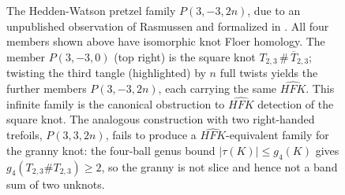 \begin{figure}[ht]
\centering
{}
\caption[The Hedden-Watson pretzel family $P(3,-3,2n)$]{%
The Hedden-Watson pretzel family $P(3,-3,2n)$, due to an unpublished observation of Rasmussen and formalized in \cite{HeddenWatson2018}. All four members shown above have isomorphic knot Floer homology. The member $P(3,-3,0)$ (top right) is the square knot $T_{2,3}\,\#\,\overline{T}_{2,3}$; twisting the third tangle (highlighted) by $n$ full twists yields the further members $P(3,-3,2n)$, each carrying the same $\widehat{HFK}$. This infinite family is the canonical obstruction to $\widehat{HFK}$ detection of the square knot. The analogous construction with two right-handed trefoils, $P(3,3,2n)$, fails to produce a $\widehat{HFK}$-equivalent family for the granny knot: the four-ball genus bound $|\tau(K)| \leq g_4(K)$ gives $g_4(T_{2,3} \# T_{2,3}) \geq 2$, so the granny is not slice and hence not a band sum of two unknots.}
\label{fig:hedden_watson_family}
\end{figure}

